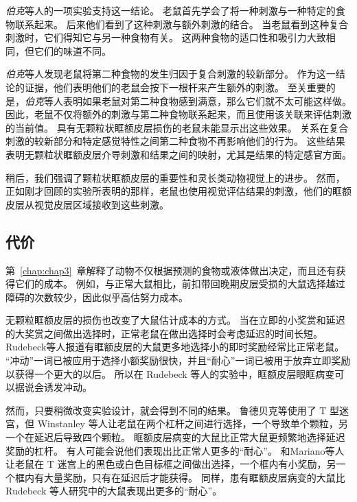 \textit{伯克}等人的一项实验支持这一结论\cite{burke2008role}。
老鼠首先学会了将一种刺激与一种特定的食物联系起来。
后来他们看到了这种刺激与额外刺激的结合。
当老鼠看到这种复合刺激时，它们得知它与另一种食物有关。
这两种食物的适口性和吸引力大致相同，但它们的味道不同。\par


\textit{伯克}等人发现老鼠将第二种食物的发生归因于复合刺激的较新部分。
作为这一结论的证据，他们表明他们的老鼠会按下一根杆来产生额外的刺激。
至关重要的是，\textit{伯克}等人表明如果老鼠对第二种食物感到满意，那么它们就不太可能这样做。
因此，老鼠不仅将额外的刺激与第二种食物联系起来，而且使用该关联来评估刺激的当前值。
具有无颗粒状眶额皮层损伤的老鼠未能显示出这些效果。
关系在复合刺激的较新部分和特定感觉特性之间第二种食物不再影响他们的行为。
这些结果表明无颗粒状眶额皮层介导刺激和结果之间的映射，尤其是结果的特定感官方面。\par


稍后，我们强调了颗粒状眶额皮层的重要性和灵长类动物视觉上的进步。
然而，正如刚才回顾的实验所表明的那样，老鼠也使用视觉评估结果的刺激，他们的眶额皮层从视觉皮层区域接收到这些刺激。\par



\subsection{代价}

第~\ref{chap:chap3}~章解释了动物不仅根据预测的食物或液体做出决定，而且还有获得它们的成本。
例如，与正常大鼠相比，前扣带回晚期皮层受损的大鼠选择越过障碍的次数较少，因此似乎高估努力成本。\par


无颗粒眶额皮层的损伤也改变了大鼠估计成本的方式。
当在立即的小奖赏和延迟的大奖赏之间做出选择时，正常老鼠在做出选择时会考虑延迟的时间长短。
Rudebeck等人\cite{rudebeck2006separate}报道有眶额皮层的大鼠更多地选择小的即时奖励经常比正常老鼠。
“冲动”一词已被应用于选择小额奖励很快，并且“耐心”一词已被用于放弃立即奖励以获得一个更大的以后。
所以在 Rudebeck 等人的实验中，眶额皮层眼眶病变可以据说会诱发冲动。\par


然而，只要稍微改变实验设计，就会得到不同的结果。
鲁德贝克等使用了 T 型迷宫，但 Winstanley 等人\cite{winstanley2004contrasting}让老鼠在两个杠杆之间进行选择，一个导致单个颗粒，另一个在延迟后导致四个颗粒。
眶额皮层病变的大鼠比正常大鼠更频繁地选择延迟奖励的杠杆。
有人可能会说他们表现出比正常人更多的“耐心”。
和Mariano等人\cite{mariano2009impulsive}让老鼠在 T 迷宫上的黑色或白色目标框之间做出选择，一个框内有小奖励，另一个框内有大量奖励，只有在延迟后才能获得。
同样，患有眶额皮层病变的大鼠比 Rudebeck 等人研究中的大鼠表现出更多的“耐心”。\par


